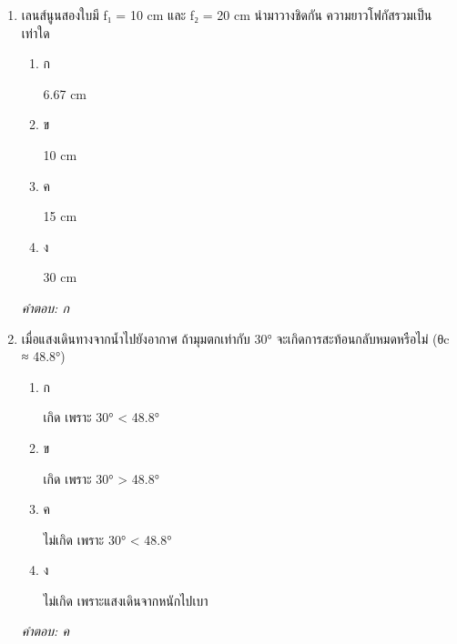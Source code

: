 \documentclass[12pt]{article}
\begin{document}
\begin{enumerate}[label=\arabic*., itemsep=0.5\baselineskip, topsep=0.5\baselineskip, leftmargin=*]
\item เลนส์นูนสองใบมี f₁ = 10 cm และ f₂ = 20 cm นำมาวางชิดกัน ความยาวโฟกัสรวมเป็นเท่าใด
\begin{enumerate}[label=\alph*)., itemsep=0.3\baselineskip, topsep=0.3\baselineskip]
\item ก\ 
\begin{minipage}[t]{0.9\linewidth}
\raggedright 6.67 cm
\end{minipage}
\item ข\ 
\begin{minipage}[t]{0.9\linewidth}
\raggedright 10 cm
\end{minipage}
\item ค\ 
\begin{minipage}[t]{0.9\linewidth}
\raggedright 15 cm
\end{minipage}
\item ง\ 
\begin{minipage}[t]{0.9\linewidth}
\raggedright 30 cm
\end{minipage}
\end{enumerate}
\vspace{-0.3\baselineskip}
\begin{small}
\textit{คำตอบ: ก}
\end{small}

\item เมื่อแสงเดินทางจากน้ำไปยังอากาศ ถ้ามุมตกเท่ากับ 30° จะเกิดการสะท้อนกลับหมดหรือไม่ (θc ≈ 48.8°)
\begin{enumerate}[label=\alph*)., itemsep=0.3\baselineskip, topsep=0.3\baselineskip]
\item ก\ 
\begin{minipage}[t]{0.9\linewidth}
\raggedright เกิด เพราะ 30° < 48.8°
\end{minipage}
\item ข\ 
\begin{minipage}[t]{0.9\linewidth}
\raggedright เกิด เพราะ 30° > 48.8°
\end{minipage}
\item ค\ 
\begin{minipage}[t]{0.9\linewidth}
\raggedright ไม่เกิด เพราะ 30° < 48.8°
\end{minipage}
\item ง\ 
\begin{minipage}[t]{0.9\linewidth}
\raggedright ไม่เกิด เพราะแสงเดินจากหนักไปเบา
\end{minipage}
\end{enumerate}
\vspace{-0.3\baselineskip}
\begin{small}
\textit{คำตอบ: ค}
\end{small}


\end{enumerate}
\end{document}
